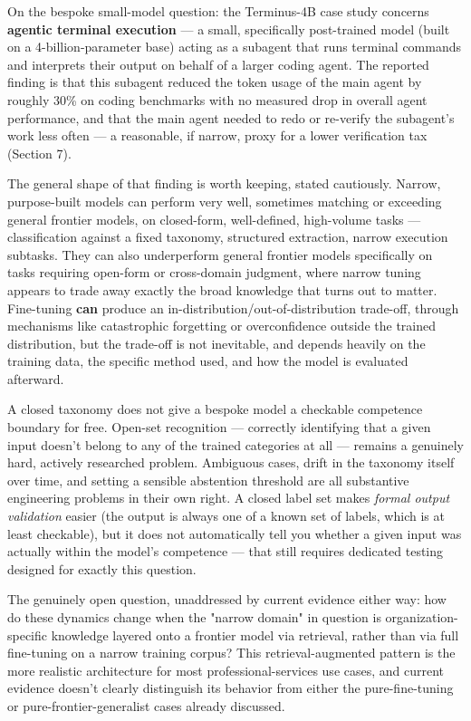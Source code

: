 On the bespoke small-model question: the Terminus-4B case study concerns \textbf{agentic terminal execution} --- a small, specifically post-trained model (built on a 4-billion-parameter base) acting as a subagent that runs terminal commands and interprets their output on behalf of a larger coding agent. The reported finding is that this subagent reduced the token usage of the main agent by roughly 30\% on coding benchmarks with no measured drop in overall agent performance, and that the main agent needed to redo or re-verify the subagent's work less often --- a reasonable, if narrow, proxy for a lower verification tax (Section 7).

The general shape of that finding is worth keeping, stated cautiously. Narrow, purpose-built models can perform very well, sometimes matching or exceeding general frontier models, on closed-form, well-defined, high-volume tasks --- classification against a fixed taxonomy, structured extraction, narrow execution subtasks. They can also underperform general frontier models specifically on tasks requiring open-form or cross-domain judgment, where narrow tuning appears to trade away exactly the broad knowledge that turns out to matter. Fine-tuning \textbf{can} produce an in-distribution/out-of-distribution trade-off, through mechanisms like catastrophic forgetting or overconfidence outside the trained distribution, but the trade-off is not inevitable, and depends heavily on the training data, the specific method used, and how the model is evaluated afterward.

A closed taxonomy does not give a bespoke model a checkable competence boundary for free. Open-set recognition --- correctly identifying that a given input doesn't belong to any of the trained categories at all --- remains a genuinely hard, actively researched problem. Ambiguous cases, drift in the taxonomy itself over time, and setting a sensible abstention threshold are all substantive engineering problems in their own right. A closed label set makes \emph{formal output validation} easier (the output is always one of a known set of labels, which is at least checkable), but it does not automatically tell you whether a given input was actually within the model's competence --- that still requires dedicated testing designed for exactly this question.

The genuinely open question, unaddressed by current evidence either way: how do these dynamics change when the "narrow domain" in question is organization-specific knowledge layered onto a frontier model via retrieval, rather than via full fine-tuning on a narrow training corpus? This retrieval-augmented pattern is the more realistic architecture for most professional-services use cases, and current evidence doesn't clearly distinguish its behavior from either the pure-fine-tuning or pure-frontier-generalist cases already discussed.
